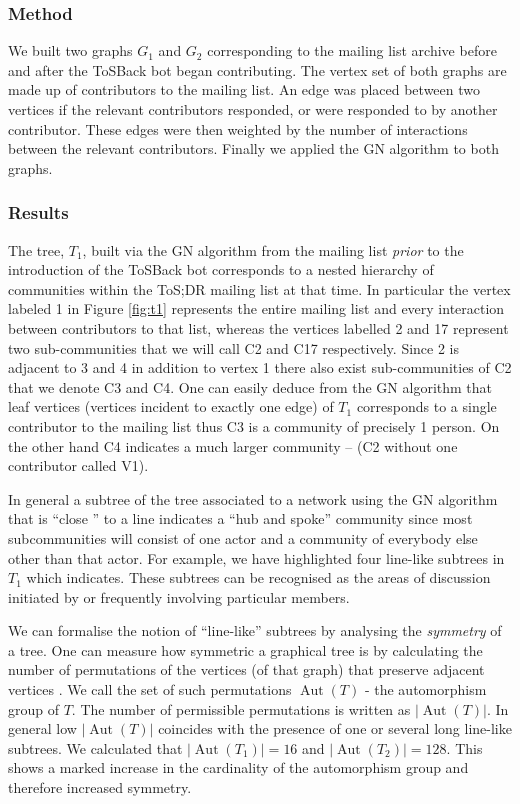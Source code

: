 \documentclass{sig-alternate}
\DeclareMathOperator{\Aut}{Aut}
\begin{document}
\subsubsection{Method}

We built two graphs $G_{1}$ and $G_2$ corresponding to the mailing list archive before and after the ToSBack bot began contributing. The vertex set of both graphs are made up of contributors to the mailing list. An edge was placed between two vertices if the relevant contributors responded, or were responded to by another contributor. These edges were then weighted by the number of interactions between the relevant contributors. Finally we applied the GN algorithm to both graphs.


\subsubsection{Results}

The tree, $T_1$, built via the GN algorithm from the mailing list \emph{prior} to the introduction of the  ToSBack bot corresponds to a nested hierarchy of communities within the ToS;DR mailing list at that time. In particular the vertex labeled 1 in Figure \ref{fig:t1} represents the entire mailing list and every interaction between contributors to that list, whereas the vertices labelled 2 and 17 represent two sub-communities that we will call C2 and C17 respectively. Since 2 is adjacent to 3 and 4 in addition to vertex 1 there also exist sub-communities of C2 that we denote C3 and C4. One can easily deduce from the GN algorithm that leaf vertices (vertices incident to exactly one edge) of $T_1$ corresponds to a single contributor to the mailing list thus C3 is a community of precisely 1 person. On the other hand C4 indicates a much larger community – (C2 without one contributor called V1).


In general a subtree of the tree associated to a network using the GN algorithm that is “close ” to a line indicates a ``hub and spoke'' community since most subcommunities will consist of one actor and a community of everybody else other than that actor. For example, we have highlighted four line-like subtrees in $T_1$ which indicates. These subtrees can be recognised as the areas of discussion initiated by or frequently involving particular members.

We can formalise the notion of “line-like” subtrees by analysing the \emph{symmetry} of  
a tree.  One can measure how symmetric
a graphical tree is by calculating the number of permutations of the
vertices (of that graph) that preserve adjacent vertices \cite{bela:mgt}. We
call the set of such permutations $\Aut(T)$ - the automorphism group of $T$.  The number of permissible permutations is written as 
$\lvert \Aut(T) \rvert$. In general low $\lvert \Aut(T) \rvert$ coincides with the presence of one or several long line-like subtrees.  We calculated that $\lvert \Aut(T_1)\rvert = 16$ and $\vert \Aut(T_2)\rvert = 128$.  This shows a marked
increase in the cardinality of the automorphism group and
therefore increased symmetry.
\end{document}
